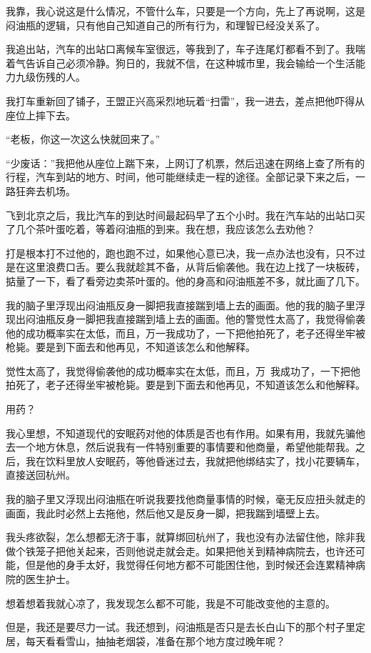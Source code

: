 我靠，我心说这是什么情况，不管什么车，只要是一个方向，先上了再说啊，这是闷油瓶的逻辑，只有他自己知道自己的所有行为，和理智已经没关系了。

我追出站，汽车的出站口离候车室很远，等我到了，车子连尾灯都看不到了。我喘着气告诉自己必须冷静。狗日的，我就不信，在这种城市里，我会输给一个生活能力九级伤残的人。

我打车重新回了铺子，王盟正兴高采烈地玩着“扫雷”，我一进去，差点把他吓得从座位上摔下去。

“老板，你这一次这么快就回来了。”

“少废话：”我把他从座位上踹下来，上网订了机票，然后迅速在网络上查了所有的行程，汽车到站的地方、时间，他可能继续走一程的途径。全部记录下来之后，一路狂奔去机场。

飞到北京之后，我比汽车的到达时间最起码早了五个小时。我在汽车站的出站口买了几个茶叶蛋吃着，等着闷油瓶的到来。我在想，我应该怎么去劝他？

打是根本打不过他的，跑也跑不过，如果他心意已决，我一点办法也没有，只不过是在这里浪费口舌。要么我就趁其不备，从背后偷袭他。我在边上找了一块板砖，掂量了一下，看了看旁边卖茶叶蛋的。他的身高和闷油瓶差不多，就比画了几下。

我的脑子里浮现出闷油瓶反身一脚把我直接踹到墙上去的画面。他的我的脑子里浮现出闷油瓶反身一脚把我直接踹到墙上去的画面。他的警觉性太高了，我觉得偷袭他的成功概率实在太低，而且，万一我成功了，一下把他拍死了，老子还得坐牢被枪毙。要是到下面去和他再见，不知道该怎么和他解释。

觉性太高了，我觉得偷袭他的成功概率实在太低，而且，万~我成功了，一下把他拍死了，老子还得坐牢被枪毙。要是到下面去和他再见，不知道该怎么和他解释。

用药？

我心里想，不知道现代的安眠药对他的体质是否也有作用。如果有用，我就先骗他去一个地方休息，然后说我有一件特别重要的事情要和他商量，希望他能帮我。之后，我在饮料里放人安眠药，等他昏迷过去，我就把他绑结实了，找小花要辆车，直接送回杭州。

我的脑子里又浮现出闷油瓶在听说我要找他商量事情的时候，毫无反应扭头就走的画面，我此时必然上去拖他，然后他又是反身一脚，把我踹到墙壁上去。

我头疼欲裂，怎么想都无济于事，就算绑回杭州了，我也没有办法留住他，除非我做个铁笼子把他关起来，否则他说走就会走。如果把他关到精神病院去，也许还可能，但是他的身手太好，我觉得任何地方都不可能困住他，到时候还会连累精神病院的医生护士。

想着想着我就心凉了，我发现怎么都不可能，我是不可能改变他的主意的。

但是，我还是要尽力一试。我还想到，闷油瓶是否只是去长白山下的那个村子里定居，每天看看雪山，抽抽老烟袋，准备在那个地方度过晚年呢？

